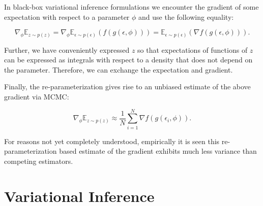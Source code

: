 \documentclass[11pt]{article}
\def\E{\mathbb{E}}
\def\eps{\epsilon}
\begin{document}
In black-box variational inference formulations we encounter the gradient of some expectation with respect to a parameter $\phi$ and use the following equality:

\begin{equation}
\nabla_\phi\E_{z\sim p(z)} = \nabla_\phi\E_{\eps\sim p(\eps)}(f(g(\eps,\phi))) = \E_{\eps\sim p(\eps)}(\nabla f(g(\eps,\phi))).
\end{equation}

Further, we have conveniently expressed $z$ so that expectations of functions of $z$ can be expressed as integrals with respect to a density that does not depend on the parameter. Therefore, we can exchange the expectation and gradient.

Finally, the re-parameterization gives rise to an unbiased estimate of the above gradient via MCMC:

\begin{equation}
\nabla_\phi\E_{z\sim p(z)} \approx \frac{1}{N} \sum_{i=1}^N \nabla f(g(\eps_i, \phi)).
\end{equation}

For reasons not yet completely understood, empirically it is seen this re-parameterization based estimate of the gradient exhibits much less variance than competing estimators.

\section{Variational Inference}


 
\end{document}
